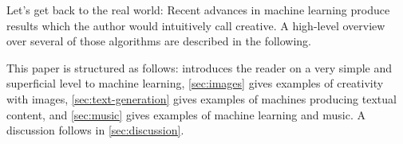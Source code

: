 
Let's get back to the real world: Recent advances in machine learning produce
results which the author would intuitively call creative. A high-level overview
over several of those algorithms are described in the following.

This paper is structured as follows:  introduces the
reader on a very simple and superficial level to machine learning,
\cref{sec:images} gives examples of creativity with images,
\cref{sec:text-generation} gives examples of machines producing textual
content, and \cref{sec:music} gives examples of machine learning and music. A
discussion follows in
\cref{sec:discussion}.
